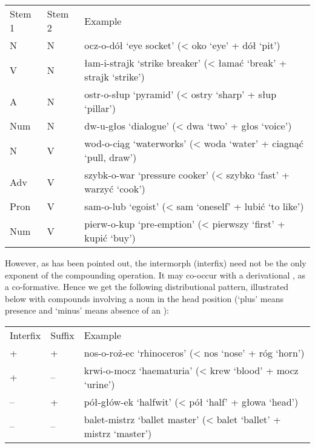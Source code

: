 \documentclass[output=paper]{LSP/langsci}
\begin{document}
\ea\label{szymanek:6} 
\begin{tabularx}{\linewidth}[t]{llQ}
Stem 1 &   Stem 2 &   Example\\
  N   & N &   ocz-o-dół ‘eye socket’ \newline
            (< oko ‘eye’ + dół ‘pit’)\\
  V  &  N  &  łam-i-strajk ‘strike breaker’ \newline
            (< łamać ‘break’ + strajk ‘strike’)\\
  A &   N &   ostr-o-słup ‘pyramid’ \newline
 (< ostry ‘sharp’ + słup ‘pillar’)\\
  Num  &  N  &  dw-u-głos ‘dialogue’ \newline
            (< dwa ‘two’ + głos ‘voice’)\\
  N  &  V  &  wod-o-ciąg ‘waterworks’ \newline
 (< woda ‘water’ + ciagnąć ‘pull, draw’)\\
  Adv  &  V  &  szybk-o-war ‘pressure cooker’ \newline
 (< szybko ‘fast’ + warzyć ‘cook’)\\
  Pron &   V &   sam-o-lub ‘egoist’ \newline
            (< sam ‘oneself’ + lubić ‘to like’)\\
  Num  &  V  &  pierw-o-kup ‘pre-emption’ \newline
 (< pierwszy ‘first’ + kupić ‘buy’)\\
 \end{tabularx}
\z 


However, as has been pointed out, the intermorph (interfix) need not be the only exponent of the compounding operation. It may co-occur with a derivational , as a co-formative. Hence we get the following distributional pattern, illustrated below with compounds involving a noun in the head position (‘plus’ means presence and ‘minus’ means absence of an ):

\ea\label{ex:szymanek:7} 
\begin{tabularx}{\linewidth}[t]{llQ}
Interfix  &  Suffix   & Example\\
  +   & +   & nos-o-roż-ec ‘rhinoceros’\newline
 {(< nos ‘nose’ + róg ‘horn’)}\\
  +   & –  &  krwi-o-mocz ‘haematuria’\newline
            (< krew ‘blood’ + mocz ‘urine’)\\
  –  &  +  &  pół-głów-ek ‘halfwit’\newline
            (< pół ‘half’ + głowa ‘head’)\\
 –  &  –  &  balet-mistrz ‘ballet master’\newline
            (< balet ‘ballet’ + mistrz ‘master’)\\
            \end{tabularx}
\z 
\end{document}
